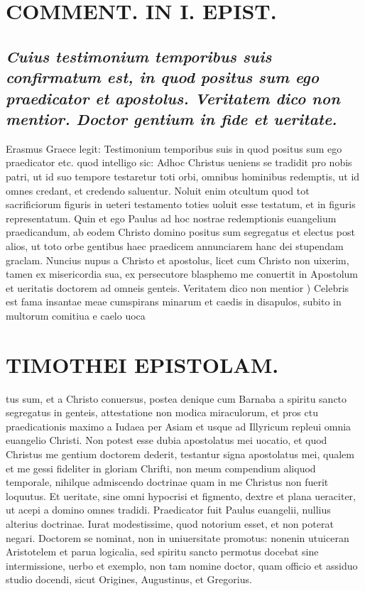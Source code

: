 \documentclass{article}
\begin{document}
\begin{pages}
\section*{COMMENT. IN I. EPIST. }
\marginpar{[ p.52 ]}
\marginpar{[ p.53 ]}
{}
\subsection*{\textit{Cuius testimonium temporibus suis confirmatum est, in quod positus sum ego praedicator et apostolus. Veritatem dico non mentior. Doctor gentium in fide et ueritate. }}\pstart Erasmus Graece legit: Testimonium temporibus suis in quod positus sum ego praedicator etc. quod intelligo sic: Adhoc Christus ueniens se tradidit pro nobis patri, ut id suo tempore testaretur toti orbi, omnibus hominibus redemptis, ut id omnes credant, et credendo saluentur. Noluit enim otcultum quod tot sacrificiorum figuris in ueteri testamento toties uoluit esse testatum, et in figuris representatum. Quin et ego Paulus ad hoc nostrae redemptionis euangelium praedicandum, ab eodem Christo domino positus sum segregatus et electus post alios, ut toto orbe gentibus haec praedicem annunciarem hanc dei stupendam graclam. Nuncius nupus a Christo et apostolus, licet cum Christo non uixerim, tamen ex misericordia sua, ex persecutore blasphemo me conuertit in Apostolum et ueritatis doctorem ad omneis genteis.  \pend\pstart Veritatem dico non mentior ) Celebris est fama insantae meae cumspirans minarum et caedis in disapulos, subito in multorum comitiua e caelo uoca\pend
\section*{TIMOTHEI EPISTOLAM. }
\marginpar{[ p.54 ]}\pstart tus sum, et a Christo conuersus, postea denique cum Barnaba a spiritu sancto segregatus in genteis, attestatione non modica miraculorum, et pros ctu praedicationis maximo a Iudaea per Asiam et usque ad Illyricum repleui omnia euangelio Christi. Non potest esse dubia apostolatus mei uocatio, et quod Christus me gentium doctorem dederit, testantur signa apostolatus mei, qualem et me gessi fideliter in gloriam Chrifti, non meum compendium aliquod temporale, nihilque admiscendo doctrinae quam in me Christus non fuerit loquutus. Et ueritate, sine omni hypocrisi et figmento, dextre et plana ueraciter, ut acepi a domino omnes tradidi.  \pend\pstart Praedicator fuit Paulus euangelii, nullius alterius doctrinae. Iurat modestissime, quod notorium esset, et non poterat negari. Doctorem se nominat, non in uniuersitate promotus: nonenin utuiceran Aristotelem et parua logicalia, sed spiritu sancto permotus docebat sine intermissione, uerbo et exemplo, non tam nomine doctor, quam officio et assiduo studio docendi, sicut Origines, Augustinus, et Gregorius.  \pend
{}
{}

\end{pages}
\end{document}
